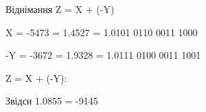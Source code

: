 \documentclass[12pt,a4paper]{article}
\begin{document}
    \begin{center}
        \large Віднімання Z = X + (-Y)
    \end{center}

    X = -5473 = 1.4527 = 1.0101 0110 0011 1000

    -Y = -3672 = 1.9328 = 1.0111 0100 0011 1001

    Z = X + (-Y):

    \vspace{1em}


    \vspace{1em}

    Звідси 1.0855 = -9145

    \newpage
\end{document}
